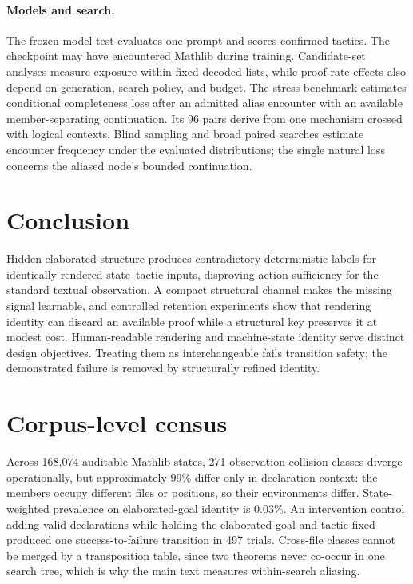 \documentclass[11pt]{article}
\begin{document}
\paragraph{Models and search.}
The frozen-model test evaluates one prompt and scores confirmed tactics. The
checkpoint may have encountered Mathlib during training. Candidate-set analyses
measure exposure within fixed decoded lists, while proof-rate effects also
depend on generation, search policy, and budget. The stress benchmark estimates
conditional completeness loss after an admitted alias encounter with an
available member-separating continuation. Its 96 pairs derive from one
mechanism crossed with logical contexts. Blind sampling and broad paired
searches estimate encounter frequency under the evaluated distributions; the
single natural loss concerns the aliased node's bounded continuation.

\section{Conclusion}

Hidden elaborated structure produces contradictory deterministic labels for
identically rendered state--tactic inputs, disproving action sufficiency for the
standard textual observation. A compact structural channel makes the missing
signal learnable, and controlled retention experiments show that rendering
identity can discard an available proof while a structural key preserves it at
modest cost. Human-readable rendering and machine-state identity serve distinct
design objectives. Treating them as interchangeable fails transition safety;
the demonstrated failure is removed by structurally refined identity.



\appendix

\section{Corpus-level census}
\label{app:census}
Across 168{,}074 auditable Mathlib states, 271 observation-collision classes
diverge operationally, but approximately 99\% differ only in declaration
context: the members occupy different files or positions, so their environments
differ. State-weighted prevalence on elaborated-goal identity is 0.03\%. An
intervention control adding valid declarations while holding the elaborated
goal and tactic fixed produced one success-to-failure transition in 497 trials.
Cross-file classes cannot be merged by a transposition table, since two
theorems never co-occur in one search tree, which is why the main text measures
within-search aliasing.
\end{document}

